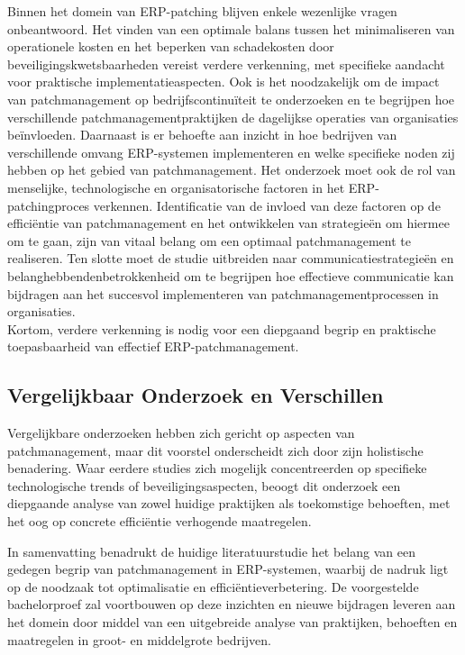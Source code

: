 Binnen het domein van ERP-patching blijven enkele wezenlijke vragen onbeantwoord. Het vinden van een optimale balans tussen het minimaliseren van operationele kosten en het beperken van schadekosten door beveiligingskwetsbaarheden vereist verdere verkenning, met specifieke aandacht voor praktische implementatieaspecten. Ook is het noodzakelijk om de impact van patchmanagement op bedrijfscontinuïteit te onderzoeken en te begrijpen hoe verschillende patchmanagementpraktijken de dagelijkse operaties van organisaties beïnvloeden. Daarnaast is er behoefte aan inzicht in hoe bedrijven van verschillende omvang ERP-systemen implementeren en welke specifieke noden zij hebben op het gebied van patchmanagement. Het onderzoek moet ook de rol van menselijke, technologische en organisatorische factoren in het ERP- patchingproces verkennen. Identificatie van de invloed van deze factoren op de efficiëntie van patchmanagement en het ontwikkelen van strategieën om hiermee om te gaan, zijn van vitaal belang om een optimaal patchmanagement te realiseren. Ten slotte moet de studie uitbreiden naar communicatiestrategieën en belanghebbendenbetrokkenheid om te begrijpen hoe effectieve communicatie kan bijdragen aan het succesvol implementeren van patchmanagementprocessen in organisaties. \\ Kortom, verdere verkenning is nodig voor een diepgaand begrip en praktische toepasbaarheid van effectief ERP-patchmanagement.
\subsection{Vergelijkbaar Onderzoek en Verschillen}

Vergelijkbare onderzoeken hebben zich gericht op aspecten van patchmanagement, maar dit voorstel onderscheidt zich door zijn holistische benadering. Waar eerdere studies zich mogelijk concentreerden op specifieke technologische trends of beveiligingsaspecten, beoogt dit onderzoek een diepgaande analyse van zowel huidige praktijken als toekomstige behoeften, met het oog op concrete efficiëntie verhogende maatregelen.

In samenvatting benadrukt de huidige literatuurstudie het belang van een gedegen begrip van patchmanagement in ERP-systemen, waarbij de nadruk ligt op de noodzaak tot optimalisatie en efficiëntieverbetering. De voorgestelde bachelorproef zal voortbouwen op deze inzichten en nieuwe bijdragen leveren aan het domein door middel van een uitgebreide analyse van praktijken, behoeften en maatregelen in groot- en middelgrote bedrijven.


